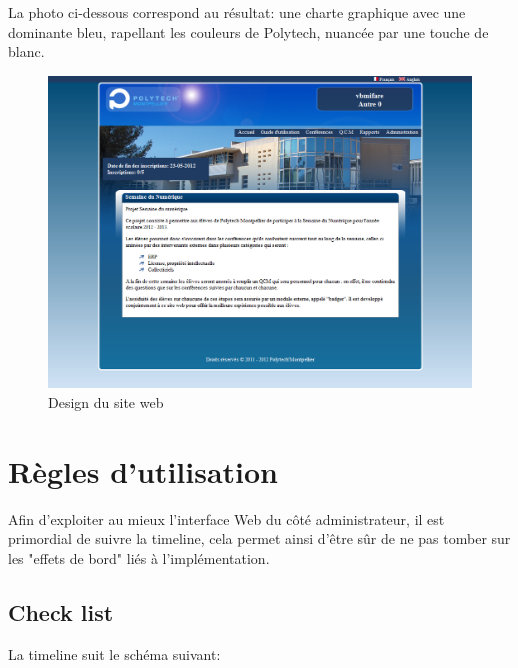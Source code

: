 La photo ci-dessous correspond au résultat: une charte graphique avec une dominante 
bleu, rapellant les couleurs de Polytech, nuancée par une touche de blanc.

    \begin{figure}[h]
        \begin{center}
        \includegraphics[scale=0.4]{images/screenSiteWeb.png} 
        \end{center}
        \caption{Design du site web}
        \label{Design du site web}
    \end{figure}
\newpage


    \section{Règles d'utilisation}

Afin d'exploiter au mieux l'interface Web du côté administrateur, il est primordial
de suivre la timeline, cela permet ainsi d'être sûr de ne pas tomber sur les "effets de bord"
liés à l'implémentation.

        \subsection{Check list}

La timeline suit le schéma suivant:

